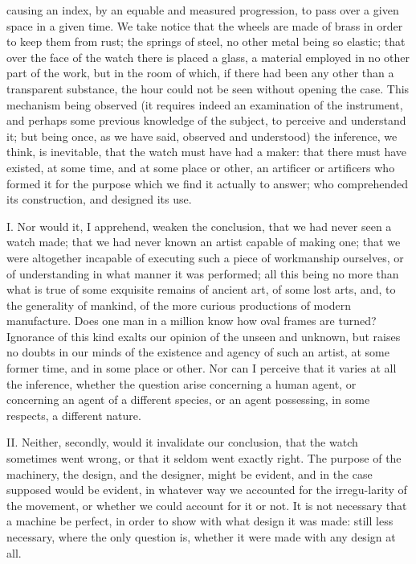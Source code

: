 causing an index, by an equable and measured progression, to pass over
a given space in a given time. We take notice that the wheels are
made of brass in order to keep them from rust; the springs of steel,
no other metal being so elastic; that over the face of the watch there
is placed a glass, a material employed in no other part of the work,
but in the room of which, if there had been any other than a
transparent substance, the hour could not be seen without opening the
case. This mechanism being observed (it requires indeed an examination
of the instrument, and perhaps some previous knowledge of the subject,
to perceive and understand it; but being once, as we have said,
observed and understood) the inference, we think, is inevitable, that
the watch must have had a maker: that there must have existed, at some
time, and at some place or other, an artificer or artificers who
formed it for the purpose which we find it actually to answer; who
comprehended its construction, and designed its use.

I. Nor would it, I apprehend, weaken the conclusion, that we had never
seen a watch made; that we had never known an artist  capable
of making one; that we were altogether incapable of executing such a
piece of workmanship ourselves, or of understanding in what manner it
was performed; all this being no more than what is true of some
exquisite remains of ancient art, of some lost arts, and, to the
generality of mankind, of the more curious productions of modern
manufacture. Does one man in a million know how oval frames are
turned? Ignorance of this kind exalts our opinion of the unseen and
unknown, but raises no doubts in our minds of the existence and agency
of such an artist, at some former time, and in some place or other.
Nor can I perceive that it varies at all the inference, whether the
question arise concerning a human agent, or concerning an agent of a
different species, or an agent possessing, in some respects, a
different nature.

II. Neither, secondly, would it invalidate our conclusion, that the
watch sometimes went wrong, or that it seldom went exactly right. The
purpose of the machinery, the design, and the designer, might be
evident, and in the case supposed would be evident, in whatever way we
accounted for the irregu-larity of the movement, or whether we
could account for it or not. It is not necessary that a machine be
perfect, in order to show with what design it was made: still less
necessary, where the only question is, whether it were made with any
design at all.

